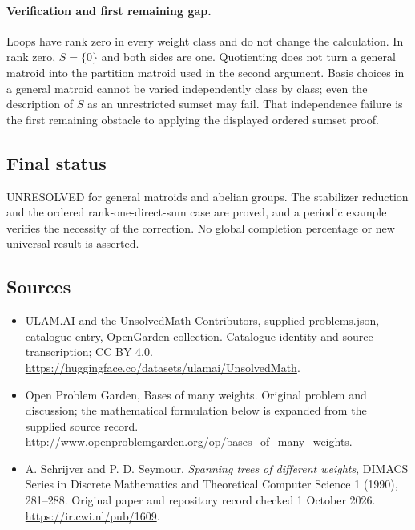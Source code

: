 \documentclass[11pt,a4paper]{article}
\begin{document}
\paragraph{Verification and first remaining gap.}
Loops have rank zero in every weight class and do not change the
calculation. In rank zero, $S=\{0\}$ and both sides are one. Quotienting
does not turn a general matroid into the partition matroid used in the
second argument. Basis choices in a general matroid cannot be varied
independently class by class; even the description of $S$ as an
unrestricted sumset may fail. That independence failure is the first
remaining obstacle to applying the displayed ordered sumset proof.

\subsection{Final status}
UNRESOLVED for general matroids and abelian groups. The stabilizer
reduction and the ordered rank-one-direct-sum case are proved, and a
periodic example verifies the necessity of the correction. No global
completion percentage or new universal result is asserted.

\subsection{Sources}
\begin{itemize}
\item[S1] ULAM.AI and the UnsolvedMath Contributors, supplied problems.json, catalogue entry, OpenGarden collection. Catalogue identity and source transcription; CC BY 4.0.
\url{https://huggingface.co/datasets/ulamai/UnsolvedMath}.
\item[S2] Open Problem Garden, Bases of many weights. Original problem and discussion; the mathematical formulation below is expanded from the supplied source record.
\url{http://www.openproblemgarden.org/op/bases_of_many_weights}.
\item[S3] A. Schrijver and P. D. Seymour, \emph{Spanning trees of different weights}, DIMACS Series in Discrete Mathematics and Theoretical Computer Science 1 (1990), 281--288. Original paper and repository record checked 1 October 2026.
\url{https://ir.cwi.nl/pub/1609}.
\end{itemize}
\end{document}
